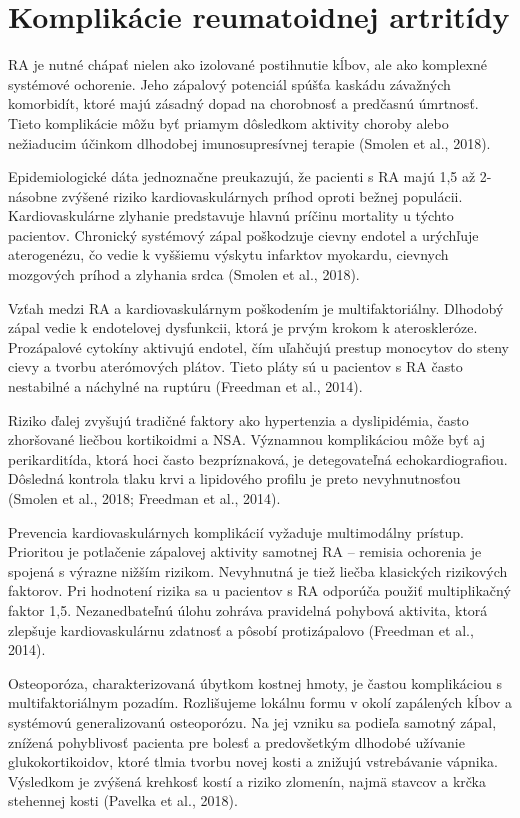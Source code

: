 \section{Komplikácie reumatoidnej artritídy}

RA je nutné chápať nielen ako izolované postihnutie kĺbov, ale ako komplexné systémové ochorenie. Jeho zápalový potenciál spúšťa kaskádu závažných komorbidít, ktoré majú zásadný dopad na chorobnosť a predčasnú úmrtnosť. Tieto komplikácie môžu byť priamym dôsledkom aktivity choroby alebo nežiaducim účinkom dlhodobej imunosupresívnej terapie (Smolen et al., 2018). 

Epidemiologické dáta jednoznačne preukazujú, že pacienti s RA majú 1,5 až 2-násobne zvýšené riziko kardiovaskulárnych príhod oproti bežnej populácii. Kardiovaskulárne zlyhanie predstavuje hlavnú príčinu mortality u týchto pacientov. Chronický systémový zápal poškodzuje cievny endotel a urýchľuje aterogenézu, čo vedie k vyššiemu výskytu infarktov myokardu, cievnych mozgových príhod a zlyhania srdca (Smolen et al., 2018). 

Vzťah medzi RA a kardiovaskulárnym poškodením je multifaktoriálny. Dlhodobý zápal vedie k endotelovej dysfunkcii, ktorá je prvým krokom k ateroskleróze. Prozápalové cytokíny aktivujú endotel, čím uľahčujú prestup monocytov do steny cievy a tvorbu aterómových plátov. Tieto pláty sú u pacientov s RA často nestabilné a náchylné na ruptúru (Freedman et al., 2014). 

Riziko ďalej zvyšujú tradičné faktory ako hypertenzia a dyslipidémia, často zhoršované liečbou kortikoidmi a NSA. Významnou komplikáciou môže byť aj perikarditída, ktorá hoci často bezpríznaková, je detegovateľná echokardiografiou. Dôsledná kontrola tlaku krvi a lipidového profilu je preto nevyhnutnosťou (Smolen et al., 2018; Freedman et al., 2014). 

Prevencia kardiovaskulárnych komplikácií vyžaduje multimodálny prístup. Prioritou je potlačenie zápalovej aktivity samotnej RA – remisia ochorenia je spojená s výrazne nižším rizikom. Nevyhnutná je tiež liečba klasických rizikových faktorov. Pri hodnotení rizika sa u pacientov s RA odporúča použiť multiplikačný faktor 1,5. Nezanedbateľnú úlohu zohráva pravidelná pohybová aktivita, ktorá zlepšuje kardiovaskulárnu zdatnosť a pôsobí protizápalovo (Freedman et al., 2014). 

Osteoporóza, charakterizovaná úbytkom kostnej hmoty, je častou komplikáciou s multifaktoriálnym pozadím. Rozlišujeme lokálnu formu v okolí zapálených kĺbov a systémovú generalizovanú osteoporózu. Na jej vzniku sa podieľa samotný zápal, znížená pohyblivosť pacienta pre bolesť a predovšetkým dlhodobé užívanie glukokortikoidov, ktoré tlmia tvorbu novej kosti a znižujú vstrebávanie vápnika. Výsledkom je zvýšená krehkosť kostí a riziko zlomenín, najmä stavcov a krčka stehennej kosti (Pavelka et al., 2018). 


